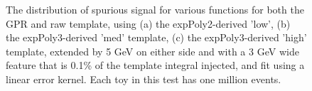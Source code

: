 \begin{figure} 
\begin{center}

\caption{The distribution of spurious signal for various functions for both the GPR and raw template, using (a) the expPoly2-derived 'low', (b) the expPoly3-derived 'med' template, (c) the expPoly3-derived 'high' template, extended by 5 GeV on either side and with a 3 GeV wide feature that is 0.1\% of the template integral injected, and fit using a linear error kernel. Each toy in this test has one million events.}
\label{fig:linearkernel_lowpt_1000_Siginj}
\end{center}
\end{figure}

